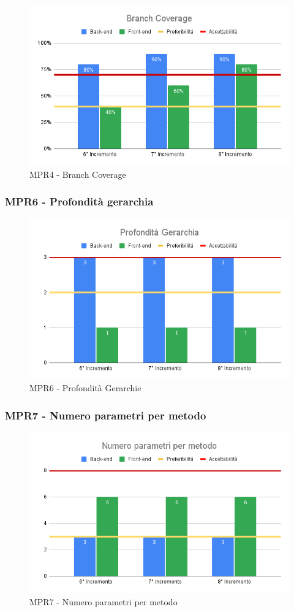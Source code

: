 \begin{figure}[H]
	\centering
	\includegraphics[scale = 0.6]{sezioni/Images/CA/BC.png}
	\caption{MPR4 - Branch Coverage}
\end{figure}

\subsubsection{MPR6 - Profondità gerarchia}

\begin{figure}[H]
	\centering
	\includegraphics[scale = 0.6]{sezioni/Images/CA/PG.png}
	\caption{MPR6 - Profondità Gerarchie}
\end{figure}

\subsubsection{MPR7 - Numero parametri per metodo}

\begin{figure}[H]
	\centering
	\includegraphics[scale = 0.6]{sezioni/Images/CA/PM.png}
	\caption{MPR7 - Numero parametri per metodo}
\end{figure}